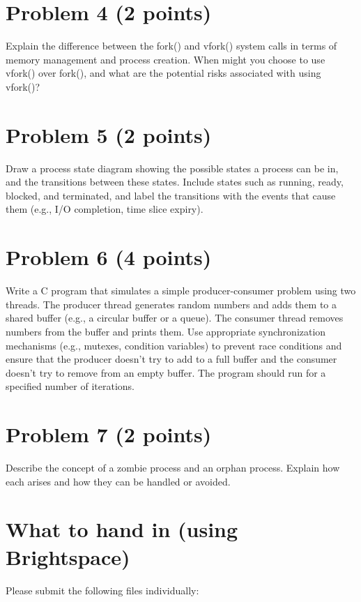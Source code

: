 \documentclass{article}
\begin{document}
\section*{Problem 4 (2 points)}

Explain the difference between the fork() and vfork() system calls in terms of memory management and process creation.  When might you choose to use vfork() over fork(), and what are the potential risks associated with using vfork()?


\section*{Problem 5 (2 points)}

Draw a process state diagram showing the possible states a process can be in, and the transitions between these states.  Include states such as running, ready, blocked, and terminated, and label the transitions with the events that cause them (e.g., I/O completion, time slice expiry).


\section*{Problem 6 (4 points)}

Write a C program that simulates a simple producer-consumer problem using two threads. The producer thread generates random numbers and adds them to a shared buffer (e.g., a circular buffer or a queue). The consumer thread removes numbers from the buffer and prints them. Use appropriate synchronization mechanisms (e.g., mutexes, condition variables) to prevent race conditions and ensure that the producer doesn't try to add to a full buffer and the consumer doesn't try to remove from an empty buffer.  The program should run for a specified number of iterations.


\section*{Problem 7 (2 points)}

Describe the concept of a zombie process and an orphan process. Explain how each arises and how they can be handled or avoided.


\section*{What to hand in (using Brightspace)}

Please submit the following files individually:
\end{document}
